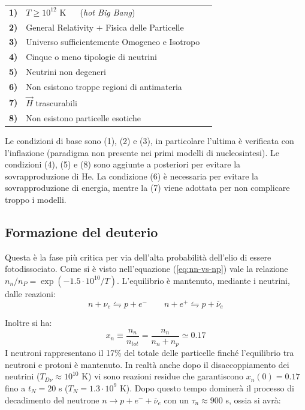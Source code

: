 \begin{table}[h]
    \def\arraystretch{1.5}
    \begin{tabular}{lll}

    \textbf{1)} & $T\ge 10^{12}$ K $\quad$  (\textit{hot Big Bang}) \\
    \textbf{2)} & General Relativity $+$ Fisica delle Particelle \\
    \textbf{3)} & Universo sufficientemente Omogeneo e Isotropo  \\
    \textbf{4)} & Cinque o meno tipologie di neutrini \\
    \textbf{5)} & Neutrini non degeneri \\
    \textbf{6)} & Non esistono troppe regioni di antimateria \\
    \textbf{7)} & $\vec{H}$ trascurabili  \\
    \textbf{8)} & Non esistono particelle esotiche \\
    \end{tabular}
    \end{table}

Le condizioni di base sono (1), (2) e (3), in particolare l'ultima è verificata con l'inflazione (paradigma non presente nei primi modelli di nucleosintesi). Le condizioni (4), (5) e (8) sono aggiunte a posteriori per evitare la sovrapproduzione di He. La condizione (6) è necessaria per evitare la sovrapproduzione di energia, mentre la (7) viene adottata per non complicare troppo i modelli.  

\subsection{Formazione del deuterio}
Questa è la fase più critica per via dell'alta probabilità dell'elio di essere fotodissociato. Come si è visto nell'equazione (\ref{eq:nn-vs-np}) vale la relazione $n_n / n_P = \exp{(-1.5\cdot 10^{10}/T)}$. L'equilibrio è mantenuto, mediante i neutrini, dalle reazioni:
$$
n + \nu_e \leftrightharpoons p + e^- \qquad n+e^+ \leftrightharpoons p + {\overbar{\nu}_e}
$$

Inoltre si ha:
$$
x_n \equiv \frac{n_n}{n_{tot}} = \frac{n_n}{n_n + n_p} \simeq 0.17
$$
I neutroni rappresentano il 17\% del totale delle particelle finché l'equilibrio tra neutroni e protoni è mantenuto. In realtà anche dopo il disaccoppiamento dei neutrini ($T_{D\nu}\approx 10^{10}$ K) vi sono reazioni residue che garantiscono $x_n (0)=0.17$ fino a $t_N=20$ s ($T_N=1.3 \cdot 10^{9}$ K). Dopo questo tempo dominerà il processo di decadimento del neutrone $ n \rightarrow p + e^- + {\overbar{\nu}_e}$ con un $\tau_n \approx 900$ s, ossia si avrà:



